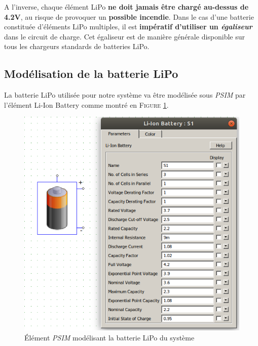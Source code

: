 		A l'inverse, chaque élément LiPo 
		\textbf{ne doit jamais être chargé au-dessus de 4.2V}, au risque de 
		provoquer un \textbf{possible incendie}. Dans le cas d'une batterie 
		constituée d'éléments LiPo multiples, il est 
		\textbf{impératif d'utiliser un \textit{égaliseur}} dans le circuit 
		de charge. Cet égaliseur est de manière générale disponible sur tous
		les chargeurs standards de batteries LiPo.
		
			
		\subsection{Modélisation de la batterie LiPo}
			
		La batterie LiPo utilisée pour notre système va être modélisée sous 
		\textit{PSIM} par l'élément Li-Ion Battery comme montré en 
		\textsc{Figure \ref{lipo_model_psim}}.
			
		\begin{figure}[ht]
			\begin{center}
				\includegraphics[scale=0.5]{../Illus/lipo_model_psim.png}
			\end{center}
			\caption{Élément \textit{PSIM} modélisant la batterie LiPo du 
			système}
			\label{lipo_model_psim}
		\end{figure}
			
